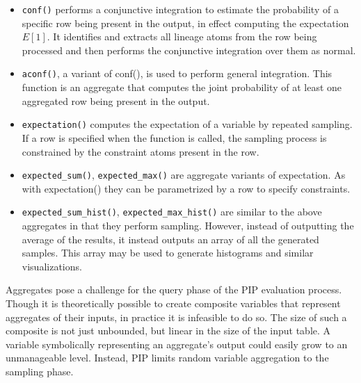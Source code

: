 \begin{itemize}
\footnotesize
\item \texttt{conf()} performs a conjunctive integration to estimate the probability of a specific row being present in the output, in effect computing the expectation $E[1]$.  It identifies and extracts all lineage atoms from the row being processed and then performs the conjunctive integration over them as normal.

\item \texttt{aconf()}, a variant of conf(), is used to perform general integration.  This function is an aggregate that computes the joint probability of at least one aggregated row being present in the output.  

\item \texttt{expectation()} computes the expectation of a variable by repeated sampling.  If a row is specified when the function is called, the sampling process is constrained by the constraint atoms present in the row.

\item \texttt{expected\_sum()}, \texttt{expected\_max()} are aggregate variants of expectation.  As with expectation() they can be parametrized by a row to specify constraints.

\item \texttt{expected\_sum\_hist()}, \texttt{expected\_max\_hist()} are similar to the above aggregates in that they perform sampling.  However, instead of outputting the average of the results, it instead outputs an array of all the generated samples.  This array may be used to generate histograms and similar visualizations.
\end{itemize}

Aggregates pose a challenge for the query phase of the PIP evaluation process.  Though it is theoretically possible to create composite variables that represent aggregates of their inputs, in practice it is infeasible to do so.  The size of such a composite is not just unbounded, but linear in the size of the input table.  A variable symbolically representing an aggregate's output could easily grow to an unmanageable level.  Instead, PIP limits random variable aggregation to the sampling phase.  



